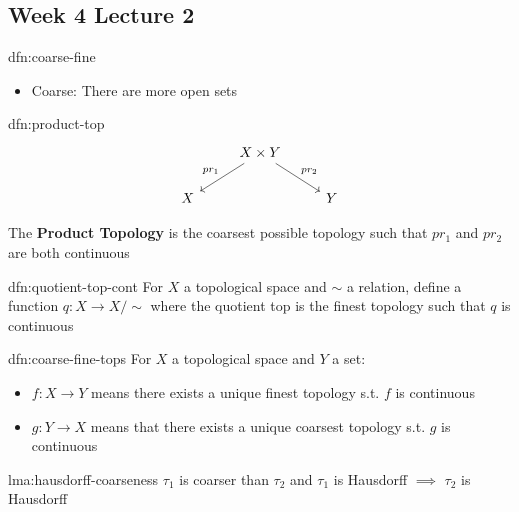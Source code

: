 \documentclass{article}
\begin{document}
\subsection{Week 4 Lecture 2}

\begin{dfn}{dfn:coarse-fine}{}
    \begin{itemize}
        \item Coarse: There are more open sets
    \end{itemize}
\end{dfn}

\begin{dfn}{dfn:product-top}{}
    \[\begin{tikzcd}
    & {X \times Y} \\
        X && Y
        \arrow["{pr_1}"', from=1-2, to=2-1]
        \arrow["{pr_2}", from=1-2, to=2-3]
    \end{tikzcd}\]

    The \textbf{Product Topology} is the coarsest possible topology such that $pr_{1}$ and $pr_{2}$ are both continuous
\end{dfn}

\begin{dfn}{dfn:quotient-top-cont}{}
    For $X$ a topological space and $\sim$ a relation, define a function $q : X \to X /\sim$ where the quotient top is the finest topology such that $q$ is continuous
\end{dfn}


\begin{dfn}{dfn:coarse-fine-tops}{}
    For $X$ a topological space and $Y$ a set:
    \begin{itemize}
        \item $f: X \to Y$ means there exists a unique finest topology s.t. $f$ is continuous
        \item $g : Y \to X$ means that there exists a unique coarsest topology s.t. $g$ is continuous
    \end{itemize}
\end{dfn}

\begin{lma}{lma:hausdorff-coarseness}{}
    $\tau_{1}$ is coarser than $\tau_{2}$ and $\tau_{1}$ is Hausdorff $\implies$ $\tau_{2}$ is Hausdorff
\end{lma}
\end{document}
